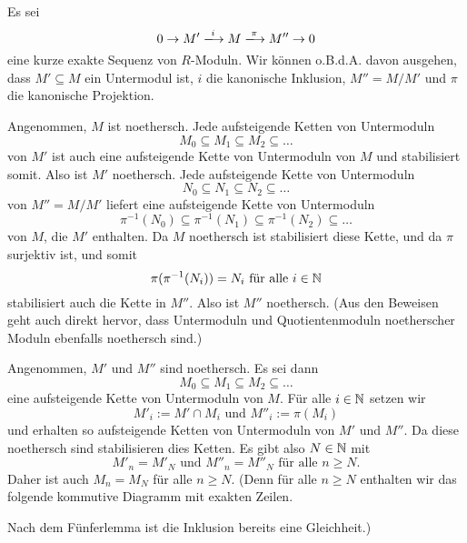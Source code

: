 \documentclass[a4paper,10pt]{article}
\begin{document}
\subsection{}
Es sei
\[
 0 \to M' \xlongrightarrow{i} M \xlongrightarrow{\pi} M'' \to 0
\]
eine kurze exakte Sequenz von $R$-Moduln. Wir können o.B.d.A. davon ausgehen, dass $M' \subseteq M$ ein Untermodul ist, $i$ die kanonische Inklusion, $M'' = M/M'$ und $\pi$ die kanonische Projektion.

Angenommen, $M$ ist noethersch. Jede aufsteigende Ketten von Untermoduln
\[
 M_0 \subseteq M_1 \subseteq M_2 \subseteq \ldots
\]
von $M'$ ist auch eine aufsteigende Kette von Untermoduln von $M$ und stabilisiert somit. Also ist $M'$ noethersch. Jede aufsteigende Kette von Untermoduln
\[
 N_0 \subseteq N_1 \subseteq N_2 \subseteq \ldots
\]
von $M'' = M/M'$ liefert eine aufsteigende Kette von Untermoduln
\[
 \pi^{-1}(N_0) \subseteq \pi^{-1}(N_1) \subseteq \pi^{-1}(N_2) \subseteq \ldots
\]
von $M$, die $M'$ enthalten. Da $M$ noethersch ist stabilisiert diese Kette, und da $\pi$ surjektiv ist, und somit
\[
 \pi(\pi^{-1}(N_i)) = N_i \text{ für alle } i \in \mathbb{N}
\]
stabilisiert auch die Kette in $M''$. Also ist $M''$ noethersch. (Aus den Beweisen geht auch direkt hervor, dass Untermoduln und Quotientenmoduln noetherscher Moduln ebenfalls noethersch sind.)

Angenommen, $M'$ und $M''$ sind noethersch. Es sei dann
\[
 M_0 \subseteq M_1 \subseteq M_2 \subseteq \ldots
\]
eine aufsteigende Kette von Untermoduln von $M$. Für alle $i \in \mathbb{N}$ setzen wir
\[
 M'_i := M' \cap M_i \text{ und } M''_i := \pi(M_i)
\]
und erhalten so aufsteigende Ketten von Untermoduln von $M'$ und $M''$. Da diese noethersch sind stabilisieren dies Ketten. Es gibt also $N \in \mathbb{N}$ mit
\[
 M'_n = M'_N \text{ und } M''_n = M''_N \text{ für alle } n \geq N.
\]
Daher ist auch $M_n = M_N$ für alle $n \geq N$. (Denn für alle $n \geq N$ enthalten wir das folgende kommutive Diagramm mit exakten Zeilen.
\begin{center}
\end{center}
Nach dem Fünferlemma ist die Inklusion bereits eine Gleichheit.)
\end{document}
